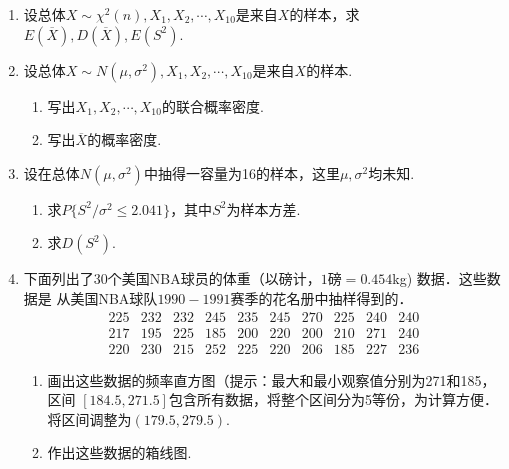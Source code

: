 \begin{enumerate}
    \item 设总体$X\sim \chi^2(n),X_1,X_2,\cdots,X_{10}$是来自$X$的样本，求$E(\overline{X}),D(\overline{X}),E(S^2)$.
    

    \item 设总体$X\sim N(\mu,\sigma^2),X_1,X_2,\cdots,X_{10}$是来自$X$的样本.
    \begin{enumerate}
        \item 写出$X_1,X_2,\cdots,X_{10}$的联合概率密度.
        \item 写出$\overline{X}$的概率密度.
    \end{enumerate}



    \item 设在总体$N(\mu,\sigma^2)$中抽得一容量为16的样本，这里$\mu,\sigma^2$均未知.
    \begin{enumerate}
        \item 求$P\{S^2/\sigma^2\leq 2.041\}$，其中$S^2$为样本方差.
        \item 求$D(S^2)$.
    \end{enumerate}



    \item 下面列出了30个美国NBA球员的体重（以磅计，$1\mbox{磅}=0.454$kg) 数据．这些数据是
    从美国NBA球队$1990-1991$赛季的花名册中抽样得到的．
    $$\begin{array}{cccccccccc}
        225 & 232 & 232 & 245 & 235 & 245 & 270 & 225 & 240 & 240 \\
        217 & 195 & 225 & 185 & 200 & 220 & 200 & 210 & 271 & 240 \\
        220 & 230 & 215 & 252 & 225 & 220 & 206 & 185 & 227 & 236
    \end{array}$$
    \begin{enumerate}
        \item 画出这些数据的频率直方图（提示：最大和最小观察值分别为271和185，区间
        $[184.5,271.5]$包含所有数据，将整个区间分为5等份，为计算方便．将区间调整为$(179.5,279.5)$.
        \item 作出这些数据的箱线图.
    \end{enumerate}



\end{enumerate}
